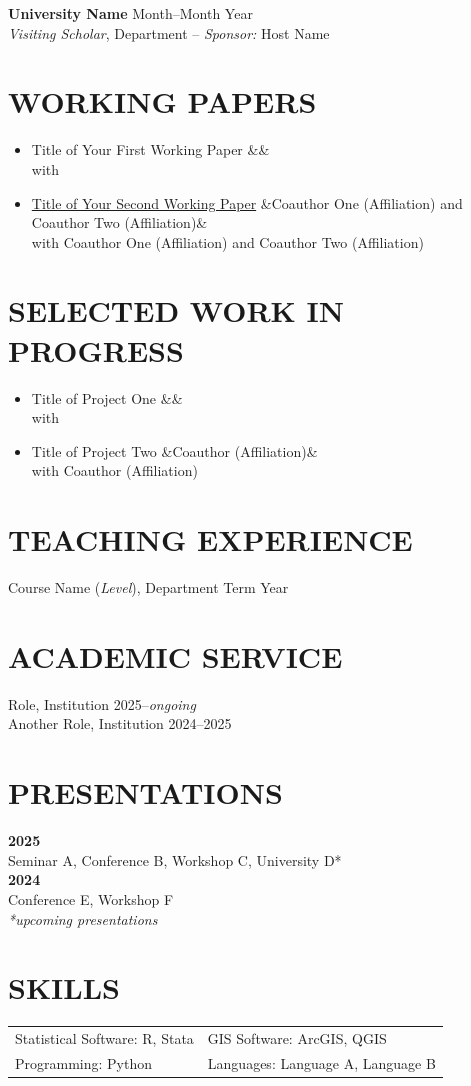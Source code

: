 \documentclass[a4paper,10pt]{article}
\newcommand{\position}[3]{%
  \textbf{#1} \hfill #2 \\
  \hspace*{1em}#3%
}
\newcommand{\paper}[2][]{%
  \item #2%
  \ifx&#1&\else\\\hspace*{1em}with #1\fi%
}
\begin{document}
\position{University Name}{Month--Month Year}%
  {\textit{Visiting Scholar}, Department -- \textit{Sponsor:} Host Name}

\section*{WORKING PAPERS}

\begin{itemize}[itemsep=0.3em, leftmargin=1em]
  \paper{Title of Your First Working Paper}
  \paper[Coauthor One (Affiliation) and Coauthor Two (Affiliation)]%
    {\href{https://link-to-paper.com}{Title of Your Second Working Paper}}
\end{itemize}

\section*{SELECTED WORK IN PROGRESS}

\begin{itemize}[itemsep=0.3em, leftmargin=1em]
  \paper{Title of Project One}
  \paper[Coauthor (Affiliation)]{Title of Project Two}
\end{itemize}

\section*{TEACHING EXPERIENCE}

Course Name (\textit{Level}), Department \hfill Term Year

\section*{ACADEMIC SERVICE}

Role, Institution \hfill 2025--\emph{ongoing} \\
Another Role, Institution \hfill 2024--2025

\section*{PRESENTATIONS}

\textbf{2025} \\
Seminar A, Conference B, Workshop C, University D* \\[2pt]
\textbf{2024} \\
Conference E, Workshop F \\[2pt]
\emph{*upcoming presentations}

\section*{SKILLS}

\begin{tabular}{@{}p{}p{}@{}}
  Statistical Software: R, Stata & GIS Software: ArcGIS, QGIS \\
  Programming: Python            & Languages: Language A, Language B \\
\end{tabular}
\end{document}

